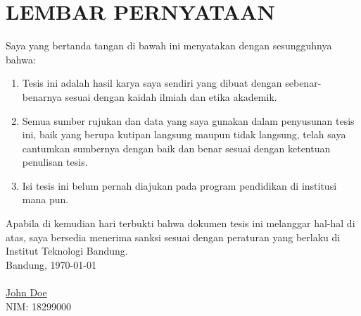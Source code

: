 \chapter*{LEMBAR PERNYATAAN}
\vspace{2cm}
Saya yang bertanda tangan di bawah ini menyatakan dengan sesungguhnya bahwa:
\begin{enumerate}
    \item Tesis ini adalah hasil karya saya sendiri yang dibuat dengan sebenar-benarnya sesuai dengan kaidah ilmiah dan etika akademik.
    \item Semua sumber rujukan dan data yang saya gunakan dalam penyusunan tesis ini, baik yang berupa kutipan langsung maupun tidak langsung, telah saya cantumkan sumbernya dengan baik dan benar sesuai dengan ketentuan penulisan tesis.
    \item Isi tesis ini belum pernah diajukan pada program pendidikan di institusi mana pun.
\end{enumerate}
Apabila di kemudian hari terbukti bahwa dokumen tesis ini melanggar hal-hal di atas, saya bersedia menerima sanksi sesuai dengan peraturan yang berlaku di Institut Teknologi Bandung.
\\[2cm]
Bandung, \today\\
\\[2cm]

\underline{John Doe} \\
NIM: 18299000
  